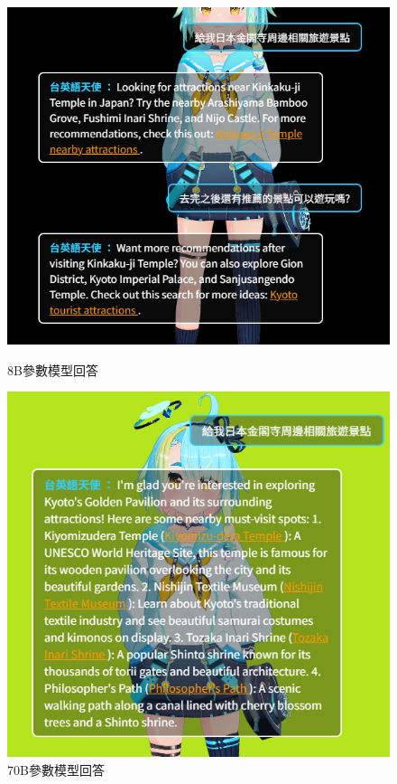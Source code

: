 \begin{figure}[htbp!]
	\centering
	\begin{minipage}{0.4\linewidth}
        \vspace{1.2em}
		\includegraphics[width=\linewidth]{images/w9/8B.png}
		\caption{8B參數模型回答}
        \label{fig:8B}
	\end{minipage}
    \hspace{1em}
	\begin{minipage}{0.4\linewidth}
		\includegraphics[width=\linewidth]{images/w9/70B.png}
		\caption{70B參數模型回答}
        \label{fig:70B}
	\end{minipage}
\end{figure}
